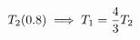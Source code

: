\documentclass[preview]{standalone}
\begin{document}
\begin{align*}
\special{dvisvgm:raw <g id='unique000'>}T_2 (0.8) \implies T_1 = \frac{4}{3} T_2\special{dvisvgm:raw </g>}
\end{align*}
\end{document}
